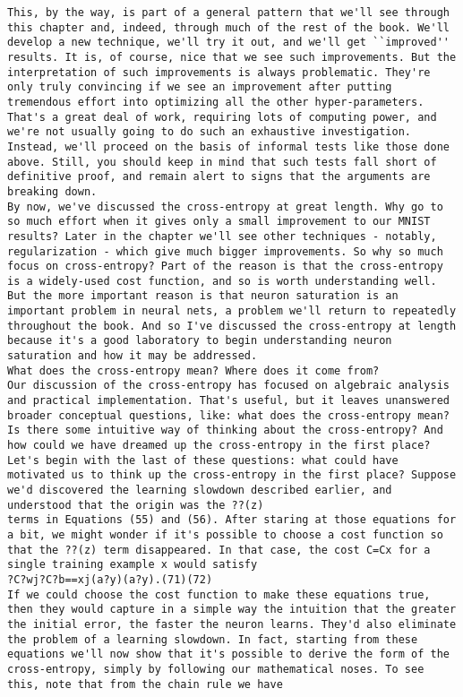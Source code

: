 \begin{lstlisting}
This, by the way, is part of a general pattern that we'll see through this chapter and, indeed, through much of the rest of the book. We'll develop a new technique, we'll try it out, and we'll get ``improved'' results. It is, of course, nice that we see such improvements. But the interpretation of such improvements is always problematic. They're only truly convincing if we see an improvement after putting tremendous effort into optimizing all the other hyper-parameters. That's a great deal of work, requiring lots of computing power, and we're not usually going to do such an exhaustive investigation. Instead, we'll proceed on the basis of informal tests like those done above. Still, you should keep in mind that such tests fall short of definitive proof, and remain alert to signs that the arguments are breaking down.
By now, we've discussed the cross-entropy at great length. Why go to so much effort when it gives only a small improvement to our MNIST results? Later in the chapter we'll see other techniques - notably, regularization - which give much bigger improvements. So why so much focus on cross-entropy? Part of the reason is that the cross-entropy is a widely-used cost function, and so is worth understanding well. But the more important reason is that neuron saturation is an important problem in neural nets, a problem we'll return to repeatedly throughout the book. And so I've discussed the cross-entropy at length because it's a good laboratory to begin understanding neuron saturation and how it may be addressed.
What does the cross-entropy mean? Where does it come from?
Our discussion of the cross-entropy has focused on algebraic analysis and practical implementation. That's useful, but it leaves unanswered broader conceptual questions, like: what does the cross-entropy mean? Is there some intuitive way of thinking about the cross-entropy? And how could we have dreamed up the cross-entropy in the first place?
Let's begin with the last of these questions: what could have motivated us to think up the cross-entropy in the first place? Suppose we'd discovered the learning slowdown described earlier, and understood that the origin was the ??(z)
terms in Equations (55) and (56). After staring at those equations for a bit, we might wonder if it's possible to choose a cost function so that the ??(z) term disappeared. In that case, the cost C=Cx for a single training example x would satisfy 
?C?wj?C?b==xj(a?y)(a?y).(71)(72)
If we could choose the cost function to make these equations true, then they would capture in a simple way the intuition that the greater the initial error, the faster the neuron learns. They'd also eliminate the problem of a learning slowdown. In fact, starting from these equations we'll now show that it's possible to derive the form of the cross-entropy, simply by following our mathematical noses. To see this, note that from the chain rule we have 

\end{lstlisting}
